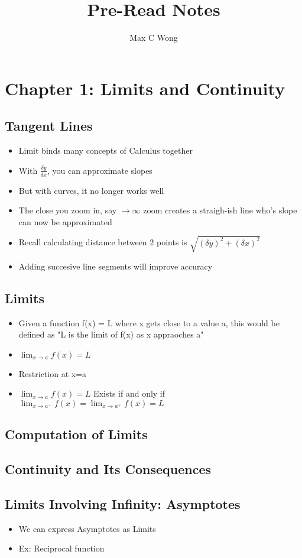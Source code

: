 \documentclass{article}
\begin{document}
    \title{Pre-Read Notes}
    \author{Max C Wong}
    \maketitle

    \section{Chapter 1: Limits and Continuity}

    \subsection{Tangent Lines}
    \begin{itemize}
        \item Limit binds many concepts of Calculus together
        \item With $\frac{\delta y}{\delta x}$, you can approximate slopes
        \item But with curves, it no longer works well
        \item The close you zoom in, say $\rightarrow \infty$ zoom creates a straigh-ish line who's slope can now be approximated
        \item Recall calculating distance between 2 points is $\sqrt{(\delta y)^2 + (\delta x)^2}$
        \item Adding succesive line segments will improve accuracy
    \end{itemize}

    \subsection{Limits}
    \begin{itemize}
        \item Given a function f(x) = L where x gets close to a value a, this would be defined as "L is the limit of f(x) as x appraoches a"
        \item $\lim_{x \to a} f(x)=L$
        \item Restriction at x=a
        \item $\lim_{x \to a} f(x)=L$ Exists if and only if $\lim_{x \to a^-} f(x) = \lim_{x \to a^+} f(x) = L$
    \end{itemize}

    \subsection{Computation of Limits}

    \subsection{Continuity and Its Consequences}

    \subsection{Limits Involving Infinity: Asymptotes}
    \begin{itemize}
        \item We can express Asymptotes as Limits
        \item Ex: Reciprocal function
    \end{itemize}

    
\end{document}
